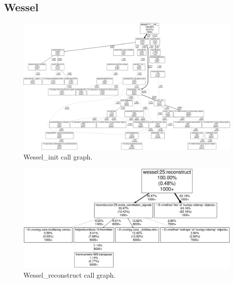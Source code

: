 \documentclass[a4paper, openany, oneside]{memoir}
\begin{document}
\subsection{Wessel}
\label{sub:profiler-wessel}

\begin{figure}[H]
    \centering
    \includegraphics[width=0.8\linewidth]{Wessel_init}
    \caption{Wessel\_init call graph.}
    \label{fig:Wessel_init}
\end{figure}

\begin{figure}[H]
    \centering
    \includegraphics[width=0.8\linewidth]{Wessel_reconstruct}
    \caption{Wessel\_reconstruct call graph.}
    \label{fig:Wessel_reconstruct}
\end{figure}
\end{document}
